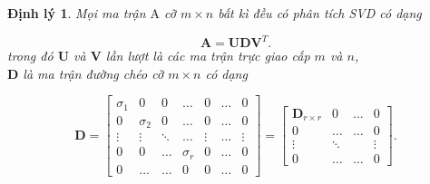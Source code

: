 \documentclass[12pt,a4paper,oneside]{report}
\newtheorem{dl}{Định lý}[section]
\numberwithin{equation}{section}
\begin{document}
\begin{dl} \cite{lay1994} Mọi ma trận $\mathrm{A}$ cỡ $m \times n$ bất kì đều có phân tích SVD có dạng

\begin{equation} \label{eq3}
\mathbf{A}=\mathbf{U D V}^{T}.
\end{equation}
trong đó $\mathbf{U}$ và $\mathbf{V}$ lần lượt là các ma trận trực giao cấp $m$ và $n$,\\
$\mathbf{D}$ là ma trận đường chéo cỡ $m \times n$ có dạng

$$
\mathbf{D}=\left[\begin{array}{ccccccc}
	\sigma_{1} & 0 & 0 & \ldots & 0 & \ldots & 0 \\
	0 & \sigma_{2} & 0 & \ldots & 0 & \ldots & 0 \\
	\vdots & \vdots & \ddots & \ldots & \vdots & \ldots & \vdots \\
	0 & 0 & \ldots & \sigma_{r} & 0 & \ldots & 0 \\
	0 & \ldots & \ldots & 0 & 0 & \ldots & 0
\end{array}\right]=\left[\begin{array}{cccc}
	\mathbf{D}_{r \times r} & 0 & \ldots & 0 \\
	0 & \ldots & \ldots & 0 \\
	\vdots & \ddots & & \vdots \\
	0 & \ldots & \ldots & 0
\end{array}\right] .
$$
\end{dl}
\end{document}
